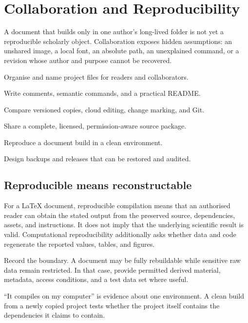 \chapter{Collaboration and Reproducibility}
\label{chap:collaboration}

A document that builds only in one author's long-lived folder is not yet a
reproducible scholarly object. Collaboration exposes hidden assumptions: an
unshared image, a local font, an absolute path, an unexplained command, or a
revision whose author and purpose cannot be recovered.

\begin{learningoutcomes}
  \item Organise and name project files for readers and collaborators.
  \item Write comments, semantic commands, and a practical README.
  \item Compare versioned copies, cloud editing, change marking, and Git.
  \item Share a complete, licensed, permission-aware source package.
  \item Reproduce a document build in a clean environment.
  \item Design backups and releases that can be restored and audited.
\end{learningoutcomes}

\section{Reproducible means reconstructable}

For a \LaTeX{} document, reproducible compilation means that an authorised reader
can obtain the stated output from the preserved source, dependencies, assets,
and instructions. It does not imply that the underlying scientific result is
valid. Computational reproducibility additionally asks whether data and code
regenerate the reported values, tables, and figures.

Record the boundary. A document may be fully rebuildable while sensitive raw
data remain restricted. In that case, provide permitted derived material,
metadata, access conditions, and a test data set where useful.

\begin{classroomnote}
``It compiles on my computer'' is evidence about one environment. A clean build
from a newly copied project tests whether the project itself contains the
dependencies it claims to contain.
\end{classroomnote}

